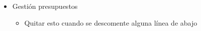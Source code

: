 \begin{itemize}
\begin{itemize}
		\end{itemize}
		\item Gestión presupuestos
		\begin{itemize}
			\item Quitar esto cuando se descomente alguna línea de abajo
			

\end{itemize}
\end{itemize}

